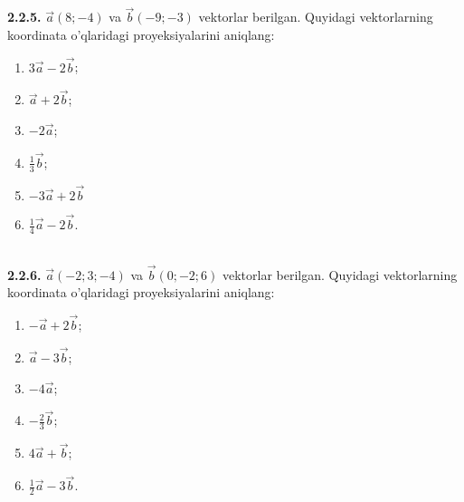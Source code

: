 \documentclass[10pt]{article}
\begin{document}
\textbf{2.2.5.} $\vec{a}(8 ;-4)$ va $\vec{b}(-9 ;-3)$ vektorlar berilgan. Quyidagi vektorlarning koordinata o'qlaridagi proyeksiyalarini aniqlang:
\begin{enumerate}
  \item $3 \vec{a}-2 \vec{b}$;
  \item $\vec{a}+2 \vec{b}$;
  \item $-2 \vec{a}$;
  \item $\frac{1}{3} \vec{b}$;
  \item $-3 \vec{a}+2 \vec{b}$
  \item $\frac{1}{4} \vec{a}-2 \vec{b}$.
\end{enumerate}\\

\textbf{2.2.6.} $\vec{a}(-2 ; 3 ;-4)$ va $\vec{b}(0 ;-2 ; 6)$ vektorlar berilgan. Quyidagi vektorlarning koordinata o'qlaridagi proyeksiyalarini aniqlang:
\begin{enumerate}
  \item $-\vec{a}+2 \vec{b}$;
  \item $\vec{a}-3 \vec{b}$;
  \item $-4 \vec{a}$;
  \item $-\frac{2}{3} \vec{b}$;
  \item $4 \vec{a}+\vec{b}$;
  \item $\frac{1}{2} \vec{a}-3 \vec{b}$.
\end{enumerate}\\
\end{document}
